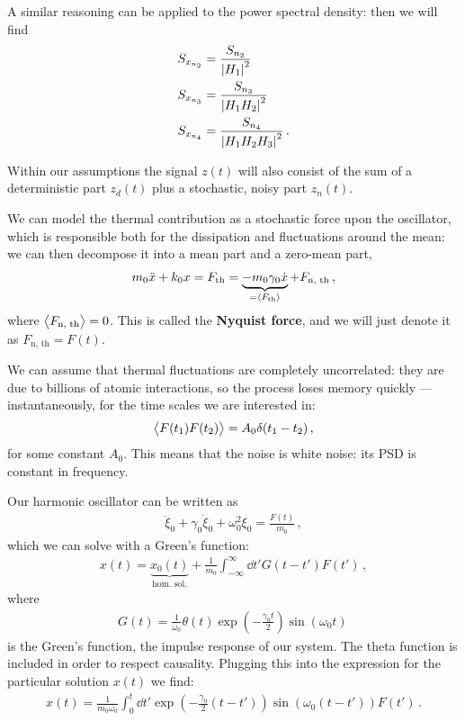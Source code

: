 \documentclass[main.tex]{subfiles}
\begin{document}
A similar reasoning can be applied to the power spectral density: then we will find 
%
\begin{align}
S_{x_{n_2}} &= \frac{S_{n_2}}{\abs{H_1}^2} \\
S_{x_{n_3}} &= \frac{S_{n_3}}{\abs{H_1 H_2 }^2} \\
S_{x_{n_4}} &= \frac{S_{n_4}}{\abs{H_1 H_2 H_3 }^2} 
\,.
\end{align}

Within our assumptions the signal \(z(t)\) will also consist of the sum of  a deterministic part \(z_d(t)\) plus a stochastic, noisy part \(z_n(t)\).

We can model the thermal contribution as a stochastic force upon the oscillator, which is responsible both for the dissipation and fluctuations around the mean: we can then decompose it into a mean part and a zero-mean part,
%
\begin{align}
m_0 \ddot{x} + k_0 x = F _{\text{th}} = \underbrace{- m_0 \gamma_0 \dot{x}}_{= \expval{F _{\text{th}}}} + F _{\text{n, th}} 
\,,
\end{align}
%
where \(\expval{F _{\text{n, th}}} = 0\). This is called the \textbf{Nyquist force}, and we will just denote it as \(F _{\text{n, th}} = F(t)\). 

We can assume that thermal fluctuations are completely uncorrelated: they are due to billions of atomic interactions, so the process loses memory quickly --- instantaneously, for the time scales we are interested in: 
%
\begin{align}
\expval{F(t_1 ) F(t_2 )} = A_0 \delta (t_1 - t_2 )
\,,
\end{align}
%
for some constant \(A_0 \). 
This means that the noise is white noise: its PSD is constant in frequency.

Our harmonic oscillator can be written as 
%
\begin{align}
\ddot{\xi}_{0} + \gamma_0 \dot{\xi}_{0} + \omega_0^2 \xi_0 = \frac{F(t)}{m_0 }
\,,
\end{align}
%
which we can solve with a Green's function: 
%
\begin{align}
x(t) = \underbrace{x_0 (t)}_{\text{hom.\ sol.}}
+ \frac{1}{m_0 } \int_{-\infty }^{\infty } \dd{t'} G(t - t') F(t')  
\,,
\end{align}
%
where 
%
\begin{align}
G(t) = \frac{1}{\omega_0} \theta (t) \exp(- \frac{\gamma_0t}{2}) \sin(\omega_0  t)
\,
\end{align}
%
is the Green's function, the impulse response of our system. The theta function is included in order to respect causality.
Plugging this into the expression for the particular solution \(x(t)\)  we find: 
%
\begin{align}
x(t) = \frac{1}{m_0 \omega_0 } \int_{0}^{t} \dd{t'} \exp(- \frac{\gamma_0}{2} (t-t')) \sin(\omega_0 (t-t')) F(t')
\,.
\end{align}
\end{document}

